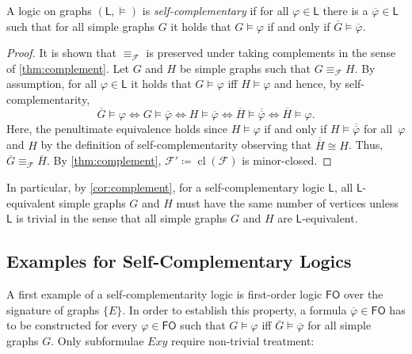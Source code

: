 \documentclass[3p,final]{elsarticle}
\renewcommand\phi\varphi
\DeclareMathOperator{\cl}{cl}
\begin{document}
	\begin{definition} \label{def:self-complementary}
		A logic on graphs $(\mathsf{L}, \models)$ is \emph{self-complementary} if for all 		
		$\phi \in \mathsf{L}$ there is a $\overline{\phi} \in \mathsf{L}$ such that
		for all simple graphs $G$ it holds that $G  \models \phi$ if and only if $ \overline{G} \models \overline{\phi}$.
	\end{definition}
	
	\thmLogic*
	
	
	\begin{proof}%
		It is shown that $\equiv_{\mathcal{F}}$ is preserved under taking complements in the sense of \cref{thm:complement}.
		Let $G$ and $H$ be simple graphs such that $G \equiv_{\mathcal{F}} H$. By assumption, for all $\phi \in \mathsf{L}$ it holds that $G \models \phi$ iff $H \models \phi$ and hence, by self-complementarity,
		\[
		\overline{G} \models \phi 
		\iff
		G \models \overline{\phi}
		\iff
		H \models \overline{\phi}
		\iff
		\overline{H} \models \overline{\overline{\phi}}
		\iff
		\overline{H} \models \phi.
		\]
		Here, the penultimate equivalence holds since $H \models \phi$ if and only if $H \models \overline{\overline{\phi}}$ for all~$\phi$ and $H$ by the definition of self-complementarity observing that $\overline{\overline{H}} \cong H$.
		Thus, $\overline{G} \equiv_{\mathcal{F}} \overline{H}$.
		By \cref{thm:complement}, $\mathcal{F}' \coloneqq \cl(\mathcal{F})$ is minor-closed.
	\end{proof}
	

	In particular, by \cref{cor:complement}, 
	for a self-complementary logic $\mathsf{L}$,
	all $\mathsf{L}$-equivalent simple graphs $G$ and $H$ must have the same number of vertices unless $\mathsf{L}$ is trivial in the sense that all simple graphs $G$ and $H$ are $\mathsf{L}$-equivalent.

	\subsection{Examples for Self-Complementary Logics}
	A first example of a self-complementarity logic is first-order logic $\mathsf{FO}$ over the signature of graphs $\{E\}$.
	In order to establish this property, 
	a formula $\overline{\phi} \in \mathsf{FO}$ has to be constructed for every $\phi \in \mathsf{FO}$ such that $G \models \phi$ iff $\overline{G} \models \overline{\phi}$ for all simple graphs $G$. Only subformulae $Exy$ require non-trivial treatment:
	
\end{document}
